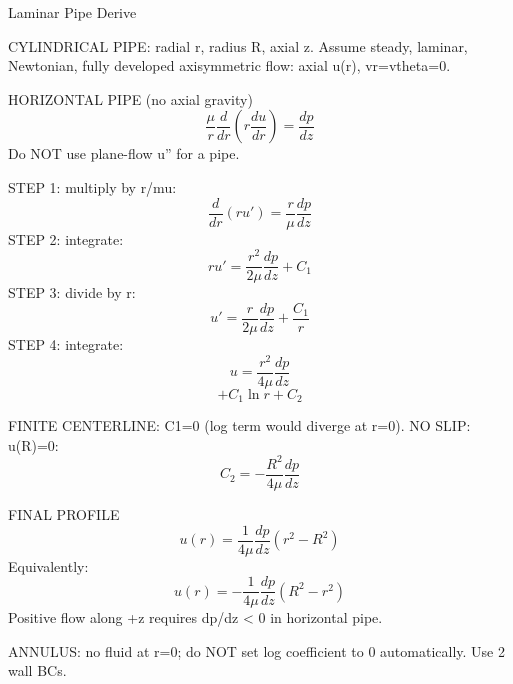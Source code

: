 Laminar Pipe Derive

CYLINDRICAL PIPE: radial r, radius R, axial z.
Assume steady, laminar, Newtonian, fully developed axisymmetric flow: axial u(r), vr=vtheta=0.

HORIZONTAL PIPE (no axial gravity)
$$\frac{\mu}{r}\frac{d}{dr}(r\frac{du}{dr})=\frac{dp}{dz}$$
Do NOT use plane-flow u'' for a pipe.

STEP 1: multiply by r/mu:
$$\frac{d}{dr}(ru')=\frac{r}{\mu}\frac{dp}{dz}$$
STEP 2: integrate:
$$ru'=\frac{r^2}{2\mu}\frac{dp}{dz}+C_1$$
STEP 3: divide by r:
$$u'=\frac{r}{2\mu}\frac{dp}{dz}+\frac{C_1}{r}$$
STEP 4: integrate:
$$u=\frac{r^2}{4\mu}\frac{dp}{dz}$$
$$+C_1\ln r+C_2$$

FINITE CENTERLINE: C1=0 (log term would diverge at r=0).
NO SLIP: u(R)=0:
$$C_2=-\frac{R^2}{4\mu}\frac{dp}{dz}$$

FINAL PROFILE
$$u(r)=\frac{1}{4\mu}\frac{dp}{dz}(r^2-R^2)$$
Equivalently:
$$u(r)=-\frac{1}{4\mu}\frac{dp}{dz}(R^2-r^2)$$
Positive flow along +z requires dp/dz < 0 in horizontal pipe.

ANNULUS: no fluid at r=0; do NOT set log coefficient to 0 automatically. Use 2 wall BCs.
